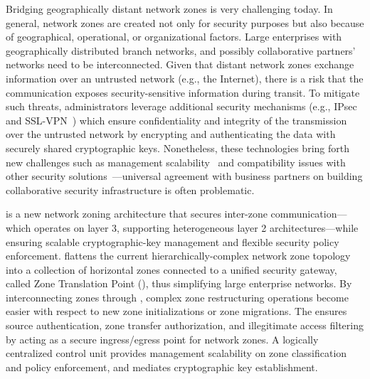 Bridging geographically distant network zones is very challenging today. In general,
network zones are created not only for security purposes but also because of geographical,
operational, or organizational factors. Large enterprises with geographically distributed 
branch networks, and possibly collaborative partners' networks need to be interconnected. 
Given that distant network zones exchange information over an untrusted 
network (e.g., the Internet), there is a risk that the communication exposes security-sensitive 
information during transit. To mitigate
such threats, administrators leverage additional security mechanisms (e.g.,
IPsec~\cite{rfc4301} and SSL-VPN~\cite{sun2011advantages}) 
which ensure confidentiality
and integrity of the transmission over the untrusted network by encrypting and authenticating the data with
securely shared cryptographic keys. Nonetheless, these technologies bring forth new challenges
such as management scalability~\cite{felsch2018dangers} and compatibility issues with other   
security solutions~\cite{liu2008collaborative}---universal agreement with business partners on building collaborative security infrastructure is often problematic.


\name is a new network zoning architecture that secures inter-zone communication---which 
operates on layer 3, supporting heterogeneous layer 2 architectures---while ensuring 
scalable cryptographic-key management and flexible security policy enforcement. 
\name flattens the current hierarchically-complex network zone topology into a collection of 
horizontal zones connected to a unified security gateway, called Zone Translation Point 
(\tp), thus simplifying large enterprise networks.
By interconnecting zones through \tps, complex zone restructuring operations become
easier with respect to new zone initializations or zone migrations.
The \tp ensures source authentication, zone transfer authorization, and illegitimate access filtering by acting as a secure ingress/egress point for network zones. A logically centralized control unit provides management scalability on zone classification and policy enforcement, and mediates cryptographic key establishment. 

